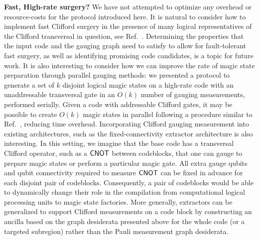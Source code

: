 \textbf{Fast, High-rate surgery? }We have not attempted to optimize any overhead or resource-costs for the protocol introduced here. It is natural to consider how to implement fast Clifford surgery in the presence of many logical representatives of the Clifford transversal in question, see Ref.~\cite{williamson2026fast}. Determining the properties that the input code and the gauging graph need to satisfy to allow for fault-tolerant fast surgery, as well as identifying promising code candidates, is a topic for future work. It is also interesting to consider how we can improve the rate of magic state preparation through parallel gauging methods: we presented a protocol to generate a set of $k$ disjoint logical magic states on a high-rate code with an unaddressable transversal gate in an $O(k)$ number of gauging measurements, performed serially. Given a code with addressable Clifford gates, it may be possible to create $O(k)$ magic states in parallel following a procedure similar to Ref.~\cite{cowtan2025parallel,Zhang_2025}, reducing time overhead. Incorporating Clifford gauging measurement into existing architectures, such as the fixed-connectivity extractor architecture \cite{he2025extractorsqldpcarchitecturesefficient} is also interesting. In this setting, we imagine that the base code has a transversal Clifford operator, such as a $\mathsf{CNOT}$ between codeblocks, that one can gauge to prepare magic states or perform a particular magic gate. All extra gauge qubits and qubit connectivity required to measure $\mathsf{CNOT}$ can be fixed in advance for each disjoint pair of codeblocks. Consequently, a pair of codeblocks would be able to dynamically change their role in the compilation from computational logical processing units to magic state factories. More generally, extractors can be generalized to support Clifford measurements on a code block by constructing an ancilla based on the graph desiderata presented above for the whole code (or a targeted subregion) rather than the Pauli measurement graph desiderata.




